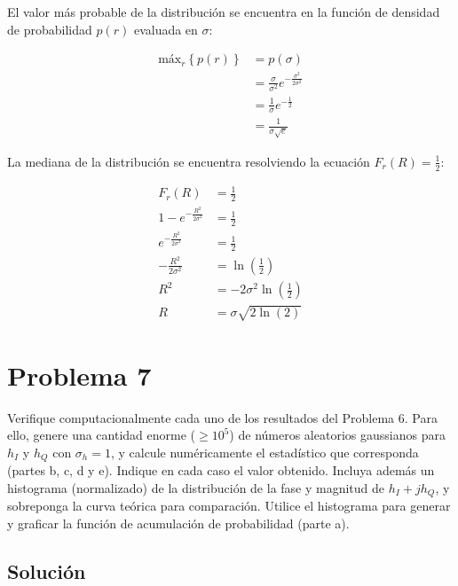 \documentclass[11pt]{article}
\begin{document}

El valor más probable de la distribución se encuentra en la función de densidad de probabilidad \(p(r)\) evaluada en \(\sigma\):

\begin{align*}
    \text{máx}_r \left\{p(r)\right\} &= p(\sigma) \\
    &= \frac{\sigma}{\sigma^2} e^{-\frac{\sigma^2}{2\sigma^2}} \\
    &= \frac{1}{\sigma} e^{-\frac{1}{2}} \\
    &= \frac{1}{\sigma \sqrt{e}}
\end{align*}


La mediana de la distribución se encuentra resolviendo la ecuación \(F_r(R) = \frac{1}{2}\):

\begin{align*}
    F_r(R) &= \frac{1}{2} \\
    1 - e^{-\frac{R^2}{2\sigma^2}} &= \frac{1}{2} \\
    e^{-\frac{R^2}{2\sigma^2}} &= \frac{1}{2} \\
    -\frac{R^2}{2\sigma^2} &= \ln\left(\frac{1}{2}\right) \\
    R^2 &= -2\sigma^2 \ln\left(\frac{1}{2}\right) \\
    R &= \sigma \sqrt{2 \ln(2)}
\end{align*}

\section*{Problema 7}

Verifique computacionalmente cada uno de los resultados del Problema 6. Para ello, genere una cantidad enorme (\(\geq 10^5\)) de números aleatorios gaussianos para \(h_I\) y \(h_Q\) con \(\sigma_h = 1\), y calcule numéricamente el estadístico que corresponda (partes b, c, d y e). Indique en cada caso el valor obtenido. Incluya además un histograma (normalizado) de la distribución de la fase y magnitud de \(h_I + j h_Q\), y sobreponga la curva teórica para comparación. Utilice el histograma para generar y graficar la función de acumulación de probabilidad (parte a).

\subsection*{Solución}
\end{document}

